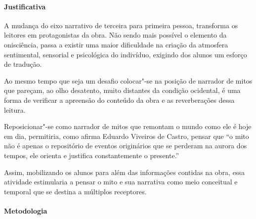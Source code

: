 \documentclass[12pt]{extarticle}
\begin{document}
\paragraph{Justificativa} A mudança do eixo narrativo de terceira para primeira
pessoa, transforma os leitores em protagonistas da obra. Não sendo mais possível
o elemento da onisciência, passa a existir uma maior dificuldade na criação da 
atmosfera sentimental, sensorial e psicológica do indivíduo, exigindo dos alunos
um esforço de tradução.

Ao mesmo tempo que seja um desafio colocar"-se na posição de narrador de mitos que 
pareçam, ao olho desatento, muito distantes da condição ocidental, é uma forma de 
verificar a apreensão do conteúdo da obra e as reverberações dessa leitura. 

Reposicionar"-se como narrador de mitos que remontam o mundo como ele é hoje em dia, 
permitiria, como afirma Eduardo Viveiros de Castro, pensar que ``o mito não é apenas 
o repositório de eventos originários que se perderam na aurora dos tempos, ele orienta 
e justifica constantemente o presente.'' 

Assim, mobilizando os alunos para além das informações contidas na obra, essa atividade 
estimularia a pensar o mito e sua narrativa como meio conceitual e temporal que se destina
a múltiplos receptores.

\paragraph{Metodologia}
\end{document}
